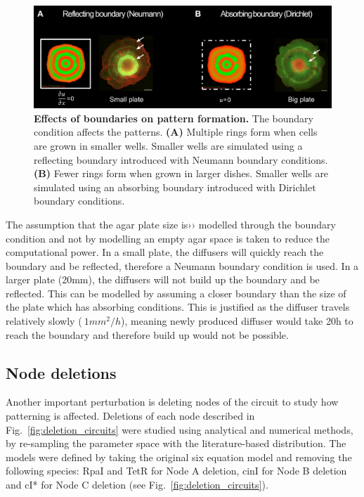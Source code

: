 \begin{figure}[H] %
    \centering
    \begin{adjustbox}{center}
        \includegraphics[width=1\textwidth]{chapters/Chapter 3/boundary_conditions_colony} %
    \end{adjustbox}
    \caption{\textbf{Effects of boundaries on pattern formation.} The boundary condition affects the patterns. \textbf{(A)} Multiple rings form when cells are grown in smaller wells. Smaller wells are simulated using a reflecting boundary introduced with Neumann boundary conditions. \textbf{(B)} Fewer rings form when grown in larger dishes. Smaller wells are simulated using an absorbing boundary introduced with Dirichlet boundary conditions.}
    \label{fig:boundary_conditions_colony}
\end{figure}

The assumption that the agar plate size is›› modelled through the boundary condition and not by modelling an empty agar space is taken to reduce the computational power.
In a small plate, the diffusers will quickly reach the boundary and be reflected, therefore a Neumann boundary condition is used.
In a larger plate (20mm), the diffusers will not build up the boundary and be reflected. This can be modelled by assuming a closer boundary than the size of the plate which has absorbing conditions.
This is justified as the diffuser travels relatively slowly ($~1mm^2/h$), meaning newly produced diffuser would take 20h to reach the boundary and therefore build up would not be possible.

\subsection{Node deletions}
Another important perturbation is deleting nodes of the circuit to study how patterning is affected.
Deletions of each node described in Fig.~\ref{fig:deletion_circuits} were studied using analytical and numerical methods, by re-sampling the parameter space with the literature-based distribution.
The models were defined by taking the original six equation model and removing the following species: RpaI and TetR for Node A deletion, cinI for Node B deletion and cI* for Node C deletion (see Fig.~\ref{fig:deletion_circuits}).


